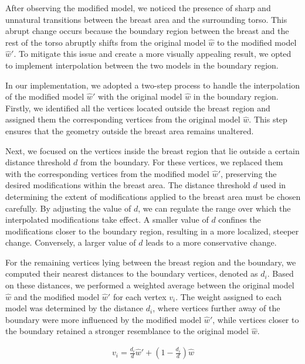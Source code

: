 After observing the modified model, we noticed the presence of sharp and unnatural transitions between the breast area and the surrounding torso. This abrupt change occurs because the boundary 
region between the breast and the rest of the torso abruptly shifts from the original model $\hat{w}$ to the modified model $\hat{w}'$. To mitigate this issue and create a more visually 
appealing result, we opted to implement interpolation between the two models in the boundary region.

In our implementation, we adopted a two-step process to handle the interpolation of the modified model $\hat{w}'$ with the original model $\hat{w}$ in the boundary region. Firstly, 
we identified all the vertices located outside the breast region and assigned them the corresponding vertices from the original model $\hat{w}$. This step ensures that the geometry 
outside the breast area remains unaltered.

Next, we focused on the vertices inside the breast region that lie outside a certain distance threshold $d$ from the boundary. For these vertices, we replaced them with the corresponding 
vertices from the modified model $\hat{w}'$, preserving the desired modifications within the breast area. The distance threshold $d$ used in determining the extent of 
modifications applied to the breast area must be chosen carefully. By adjusting the value of $d$, we can regulate the range over which the interpolated modifications take effect. 
A smaller value of $d$ confines the modifications closer to the boundary region, resulting in a more localized, steeper change. Conversely, a larger value of $d$ leads to a more conservative
change.

For the remaining vertices lying between the breast region and the boundary, we computed their nearest distances to the boundary vertices, denoted as $d_i$. Based on these distances, 
we performed a weighted average between the original model $\hat{w}$ and the modified model $\hat{w}'$ for each vertex $v_i$. The weight assigned to each model was determined by the 
distance $d_i$, where vertices further away of the boundary were more influenced by the modified model $\hat{w}'$, while vertices closer to the boundary retained a stronger resemblance to the 
original model $\hat{w}$.

\begin{align}\label{eq:interpolation}
    v_i = \frac{d_i}{d} \hat{w} ' + \left(1 - \frac{d_i}{d}\right) \hat{w}
\end{align}

